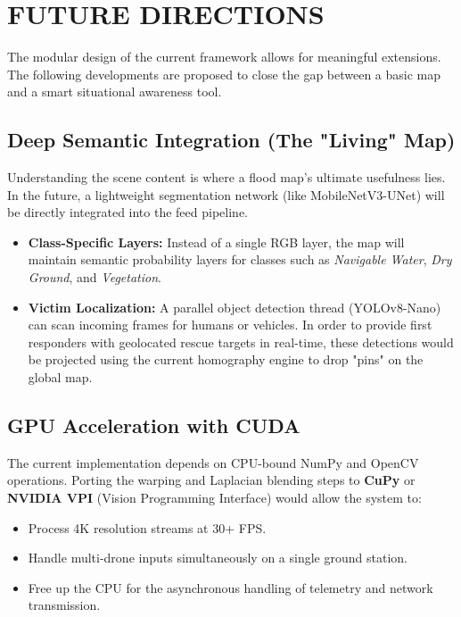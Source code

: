\documentclass[conference]{IEEEtran}
\begin{document}
\section{FUTURE DIRECTIONS}
The modular design of the current framework allows for meaningful extensions. The following developments are proposed to close the gap between a basic map and a smart situational awareness tool.

\subsection{Deep Semantic Integration (The "Living" Map)}
Understanding the scene content is where a flood map's ultimate usefulness lies. In the future, a lightweight segmentation network (like MobileNetV3-UNet) will be directly integrated into the feed pipeline.
\begin{itemize}
    \item \textbf{Class-Specific Layers:} Instead of a single RGB layer, the map will maintain semantic probability layers for classes such as \textit{Navigable Water}, \textit{Dry Ground}, and \textit{Vegetation}.
    \item \textbf{Victim Localization:} A parallel object detection thread (YOLOv8-Nano) can scan incoming frames for humans or vehicles. In order to provide first responders with geolocated rescue targets in real-time, these detections would be projected using the current homography engine to drop "pins" on the global map.
\end{itemize}

\subsection{GPU Acceleration with CUDA}
The current implementation depends on CPU-bound NumPy and OpenCV operations. Porting the warping and Laplacian blending steps to \textbf{CuPy} or \textbf{NVIDIA VPI} (Vision Programming Interface) would allow the system to:
\begin{itemize}
    \item Process 4K resolution streams at 30+ FPS.
    \item Handle multi-drone inputs simultaneously on a single ground station.
    \item Free up the CPU for the asynchronous handling of telemetry and network transmission.
\end{itemize}
\end{document}

